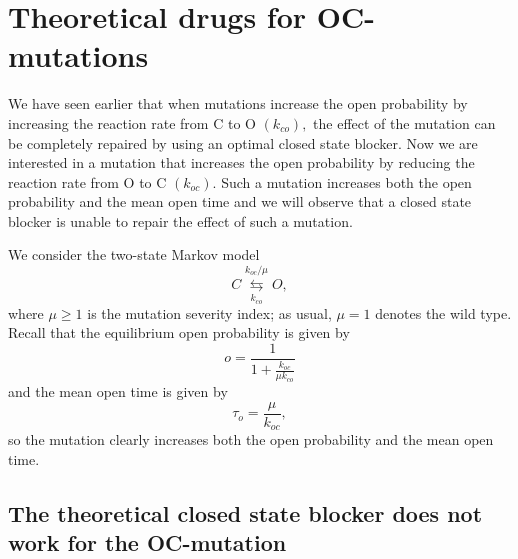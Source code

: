 \section{Theoretical drugs for OC-mutations}

We have seen earlier that when mutations increase the open probability by
increasing the reaction rate from C to O $(k_{co}),$ the effect of the
mutation can be completely repaired by using an optimal closed state blocker.
Now we are interested in a mutation that increases the open probability by reducing
the reaction rate from O to C $\left(  k_{oc}\right).$ Such a mutation
increases both the open probability and  the mean open time
and we will observe that a closed state blocker is unable to repair the effect
of such a mutation.

We consider the two-state Markov model
\begin{equation}
C\underset{k_{co}}{\overset{k_{oc}/\mu}{\leftrightarrows}}O, \label{mmm0}%
\end{equation}
where $\mu\geqslant1$ is the mutation severity index; as usual, $\mu=1$ denotes
the wild type. Recall that the equilibrium open probability is given by%
\[
o=\frac{1}{1+\frac{k_{oc}}{\mu k_{co}}}%
\]
and the mean open time is given by%
\[
\tau_{o}=\frac{\mu}{k_{oc}},%
\]
so the mutation clearly increases both the open probability and the mean open time.

\bigskip

\subsection{The theoretical closed state blocker does not work for the OC-mutation}

